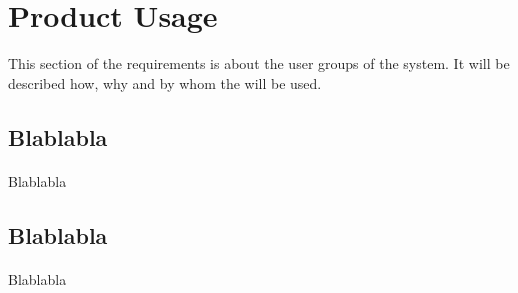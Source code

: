 \newpage
\section{Product Usage}
   This section of the requirements is about the user groups of the system. It will be described how, why and by whom the \app will be used. 

\subsection{Blablabla}
\paragraph{}Blablabla

\subsection{Blablabla}
\paragraph{}Blablabla
